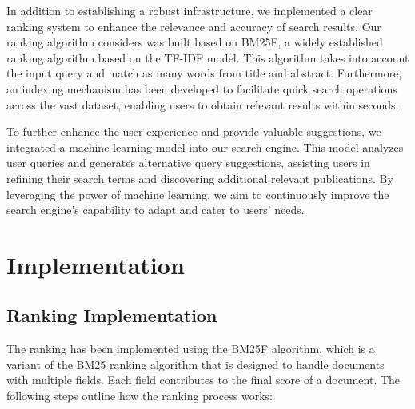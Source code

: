 \documentclass{article}
\begin{document}
In addition to establishing a robust infrastructure, we implemented a clear ranking 
system to enhance the relevance and accuracy of search results.
Our ranking algorithm considers was built based on BM25F, %
a widely established ranking algorithm based on the TF-IDF model. This algorithm takes into
account the input query and match as many words from title and abstract. 
Furthermore, an indexing mechanism has been developed
to facilitate quick search operations across the vast dataset, enabling users to obtain relevant 
results within seconds.

To further enhance the user experience and provide valuable suggestions, we integrated a machine 
learning model into our search engine. This model analyzes user queries and generates 
alternative query suggestions, assisting users in refining their search terms and discovering 
additional relevant publications. By leveraging the power of machine learning, we aim to 
continuously improve the search engine's capability to adapt and cater to users' needs.

\section{Implementation}
\subsection{Ranking Implementation}

The ranking has been implemented using the BM25F algorithm, which is a variant of the BM25 
ranking algorithm that is designed to handle documents with multiple fields. Each field 
contributes to the final score of a document. The following steps outline how the ranking 
process works:
\end{document}
